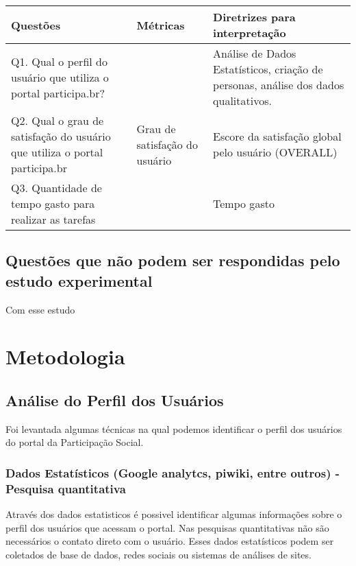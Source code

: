 \begin{table}[h]
\begin{tabular}{| p{15cm} |l|l|}
\hline
\textbf{Questões}                                                          & Métricas                      & Diretrizes para interpretação                                                       \\ \hline
Q1. Qual o perfil do usuário que utiliza o portal participa.br?            &                               & Análise de Dados Estatísticos, criação de personas, análise dos dados qualitativos. \\ \hline
Q2. Qual o grau de satisfação do usuário que utiliza o portal participa.br & Grau de satisfação do usuário & Escore da satisfação global pelo usuário (OVERALL)                                  \\ \hline
Q3. Quantidade de tempo gasto para realizar as tarefas      &                               & Tempo gasto                       \\ \hline
\end{tabular}
\end{table}


\subsection{Questões que não podem ser respondidas pelo estudo experimental}

Com esse estudo

\section{Metodologia}

\subsection{Análise do Perfil dos Usuários}

	Foi levantada algumas técnicas na qual podemos identificar o perfil dos usuários do portal da Participação Social.

\subsubsection{Dados Estatísticos (Google analytcs, piwiki, entre outros) - Pesquisa quantitativa}

	Através dos dados estatisticos é possivel identificar algumas informações sobre o perfil dos usuários que acessam o portal. Nas pesquisas quantitativas não são necessários o contato direto com o usuário. Esses dados estatísticos podem ser coletados de base de dados, redes sociais ou sistemas de análises de sites.


